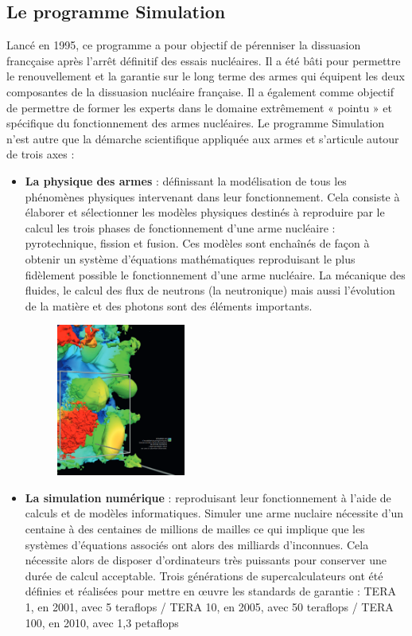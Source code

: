 \documentclass[12pt,a4paper]{report}
\begin{document}
\subsection{Le programme Simulation}
Lancé en 1995, ce programme a pour objectif de pérenniser la dissuasion francçaise après l’arrêt définitif des essais nucléaires. Il a été bâti pour permettre le renouvellement et la garantie sur le long terme des armes qui équipent les deux composantes de la dissuasion nucléaire française. Il a également comme objectif de permettre de former les experts dans le domaine extrêmement « pointu » et spécifique du fonctionnement des armes nucléaires. Le programme Simulation n’est autre que la démarche scientifique appliquée aux armes et s'articule autour de trois axes :
\renewcommand{\labelitemi}{$\bullet$}
\begin{itemize}
\item \textbf{La physique des armes} : définissant la modélisation de tous les phénomènes physiques intervenant dans leur fonctionnement. Cela consiste à élaborer et sélectionner les modèles physiques destinés à reproduire par le calcul les trois phases de fonctionnement d’une
arme nucléaire : pyrotechnique, fission et fusion. Ces modèles sont enchaînés de façon à obtenir un système d’équations mathématiques reproduisant le plus fidèlement possible le fonctionnement
d’une arme nucléaire. La mécanique des fluides, le calcul des flux de neutrons (la neutronique) mais aussi l’évolution de la matière et des photons sont des éléments importants.

\begin{figure}[H]
    \centering %
    \includegraphics[height=5cm]{Assets/Physique_arme.png}
\end{figure}




\item \textbf{La simulation numérique} : reproduisant leur fonctionnement à l'aide de calculs et de modèles informatiques. Simuler une arme nuclaire nécessite d'un centaine à des centaines de millions de mailles ce qui implique que les systèmes d'équations associés ont alors des milliards d'inconnues. Cela nécessite alors de disposer d’ordinateurs très puissants
pour conserver une durée de calcul acceptable. Trois générations de supercalculateurs ont été définies et réalisées pour mettre en œuvre les standards de garantie : TERA 1, en 2001, avec 5 teraflops / TERA 10, en 2005, avec 50 teraflops /  TERA 100, en 2010, avec 1,3 petaflops


\end{itemize}
\end{document}
